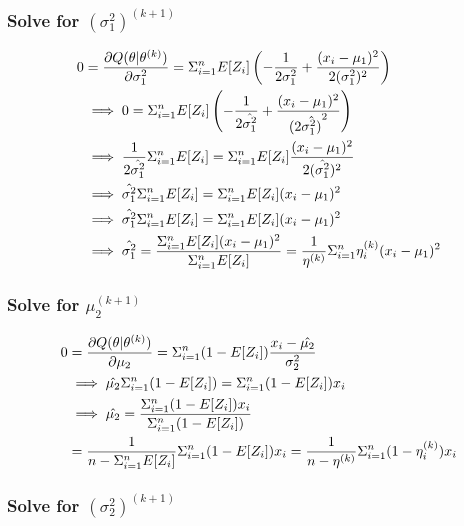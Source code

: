 \documentclass[]{article}
\begin{document}
\subsubsection{\texorpdfstring{Solve for
\((\sigma_1^2)^{(k + 1)}\)}{Solve for (\textbackslash{}sigma\_1\^{}2)\^{}\{(k + 1)\}}}\label{solve-for-sigma_12k-1}

\begin{align*}
0 &= \frac{\partial Q(\theta | \theta^{(k)})}{\partial \sigma_1^{2}} = \Sigma_{i=1}^{n} E[Z_i] \left(- \frac{1}{2 \sigma_1^2} + 
\frac{(x_i - \mu_1)^2}{ 2 (\sigma_1^2)^2}\right) \\
&\implies 0 = \Sigma_{i=1}^{n} E[Z_i] \left( 
- \frac{1}{2 \hat{\sigma_1^2}} + 
\frac{(x_i - \mu_1)^2}{(2 \hat{\sigma_1^2)}^2}
\right) \\
&\implies  \frac{1}{2\hat{\sigma_1^2}} \Sigma_{i=1}^{n} E[Z_i] = \Sigma_{i=1}^{n} E[Z_i] \frac{(x_i - \mu_1)^2}{2 (\hat{\sigma_1^2})^2} \\
&\implies \hat{\sigma_1^2} \Sigma_{i=1}^{n} E[Z_i] = \Sigma_{i=1}^{n} E[Z_i] (x_i - \mu_1)^2 \\
&\implies \hat{\sigma_1^2} \Sigma_{i=1}^{n} E[Z_i] = \Sigma_{i=1}^{n} E[Z_i] (x_i - \mu_1)^2 \\
&\implies \hat{\sigma_1^2} = \frac{\Sigma_{i=1}^{n} E[Z_i] (x_i - \mu_1)^2}{\Sigma_{i=1}^{n} E[Z_i]} = \frac{1}{\eta^{(k)}} \Sigma_{i=1}^{n} \eta^{(k)}_i (x_i - \mu_1)^2
\end{align*}

\subsubsection{\texorpdfstring{Solve for
\(\mu_2^{(k + 1)}\)}{Solve for \textbackslash{}mu\_2\^{}\{(k + 1)\}}}\label{solve-for-mu_2k-1}

\begin{align*}
0 &= \frac{\partial Q(\theta | \theta^{(k)})}{\partial \mu_2} = \Sigma_{i=1}^{n} (1 - E[Z_i]) \frac{x_i - \hat{\mu_2}}{\sigma_2^2} \\
&\implies \hat{\mu_2} \Sigma_{i=1}^{n} (1 - E[Z_i]) = \Sigma_{i=1}^{n}(1 - E[Z_i])x_i \\ 
&\implies \hat{\mu_2} = \frac{\Sigma_{i=1}^{n}(1- E[Z_i])x_i}{\Sigma_{i=1}^{n}(1- E[Z_i])} \\ 
&= \frac{1}{n - \Sigma_{i=1}^{n} E[Z_i]} \Sigma_{i=1}^{n}(1 - E[Z_i])x_i = \frac{1}{n - \eta^{(k)}} \Sigma_{i=1}^{n}(1 - \eta_i^{(k)})x_i
\end{align*}

\subsubsection{\texorpdfstring{Solve for
\((\sigma_2^2)^{(k + 1)}\)}{Solve for (\textbackslash{}sigma\_2\^{}2)\^{}\{(k + 1)\}}}\label{solve-for-sigma_22k-1}
\end{document}
